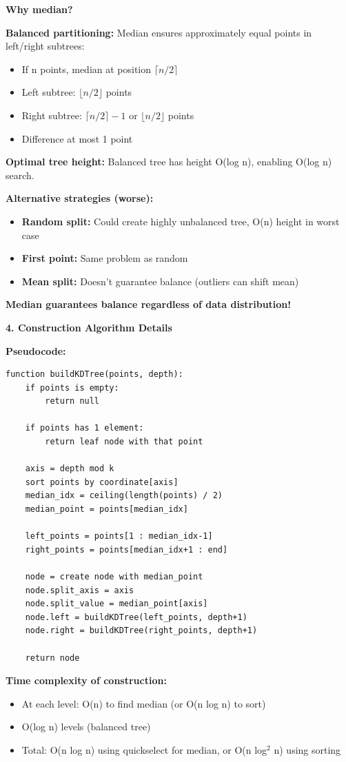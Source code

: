 \documentclass[12pt]{article}
\begin{document}
\begin{explanation}
\textbf{Why median?}

\textbf{Balanced partitioning:} Median ensures approximately equal points in left/right subtrees:
\begin{itemize}
    \item If n points, median at position $\lceil n/2 \rceil$
    \item Left subtree: $\lfloor n/2 \rfloor$ points
    \item Right subtree: $\lceil n/2 \rceil - 1$ or $\lfloor n/2 \rfloor$ points
    \item Difference at most 1 point
\end{itemize}

\textbf{Optimal tree height:} Balanced tree has height O(log n), enabling O(log n) search.

\textbf{Alternative strategies (worse):}
\begin{itemize}
    \item \textbf{Random split:} Could create highly unbalanced tree, O(n) height in worst case
    \item \textbf{First point:} Same problem as random
    \item \textbf{Mean split:} Doesn't guarantee balance (outliers can shift mean)
\end{itemize}

\textbf{Median guarantees balance regardless of data distribution!}

\textbf{4. Construction Algorithm Details}

\textbf{Pseudocode:}
\begin{verbatim}
function buildKDTree(points, depth):
    if points is empty:
        return null

    if points has 1 element:
        return leaf node with that point

    axis = depth mod k
    sort points by coordinate[axis]
    median_idx = ceiling(length(points) / 2)
    median_point = points[median_idx]

    left_points = points[1 : median_idx-1]
    right_points = points[median_idx+1 : end]

    node = create node with median_point
    node.split_axis = axis
    node.split_value = median_point[axis]
    node.left = buildKDTree(left_points, depth+1)
    node.right = buildKDTree(right_points, depth+1)

    return node
\end{verbatim}

\textbf{Time complexity of construction:}
\begin{itemize}
    \item At each level: O(n) to find median (or O(n log n) to sort)
    \item O(log n) levels (balanced tree)
    \item Total: O(n log n) using quickselect for median, or O(n log$^2$ n) using sorting
\end{itemize}


\end{explanation}
\end{document}
